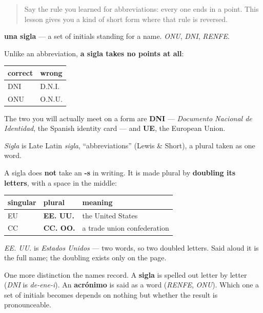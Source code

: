 \label{lesson:ES-C426-siglas}



\begin{quote}
Say the rule you learned for abbreviations: every one ends in a point. This lesson gives you a kind of short form where that rule is reversed.
\end{quote}

\begin{cousinweb}
\textbf{una sigla} — a set of initials standing for a name. \emph{ONU}, \emph{DNI}, \emph{RENFE}.

Unlike an abbreviation, \textbf{a sigla takes no points at all}:

\noindent
\begin{tabularx}{\linewidth}{@{}>{\raggedright\arraybackslash}X>{\raggedright\arraybackslash}X@{}}
\toprule
\textbf{correct} & \textbf{wrong} \\
\midrule
DNI & D.N.I. \\
ONU & O.N.U. \\
\bottomrule
\end{tabularx}

The two you will actually meet on a form are \textbf{DNI} — \emph{Documento Nacional de Identidad}, the Spanish identity card — and \textbf{UE}, the European Union.

\emph{Sigla} is Late Latin \emph{sigla}, \textquotedblleft{}abbreviations\textquotedblright{} (Lewis \& Short), a plural taken as one word.
\end{cousinweb}

\begin{grammarlens}[title={Grammar Lens: the plural, which is the strange part}]
A sigla does \textbf{not} take an \textbf{-s} in writing. It is made plural by \textbf{doubling its letters}, with a space in the middle:

\noindent
\begin{tabularx}{\linewidth}{@{}>{\raggedright\arraybackslash}X>{\raggedright\arraybackslash}X>{\raggedright\arraybackslash}X@{}}
\toprule
\textbf{singular} & \textbf{plural} & \textbf{meaning} \\
\midrule
EU & \textbf{EE. UU.} & the United States \\
CC & \textbf{CC. OO.} & a trade union confederation \\
\bottomrule
\end{tabularx}

\emph{EE. UU.} is \emph{Estados Unidos} — two words, so two doubled letters. Said aloud it is the full name; the doubling exists only on the page.

One more distinction the names record. A \textbf{sigla} is spelled out letter by letter (\emph{DNI} is \emph{de-ene-i}). An \textbf{acrónimo} is said as a word (\emph{RENFE}, \emph{ONU}). Which one a set of initials becomes depends on nothing but whether the result is pronounceable.
\end{grammarlens}

